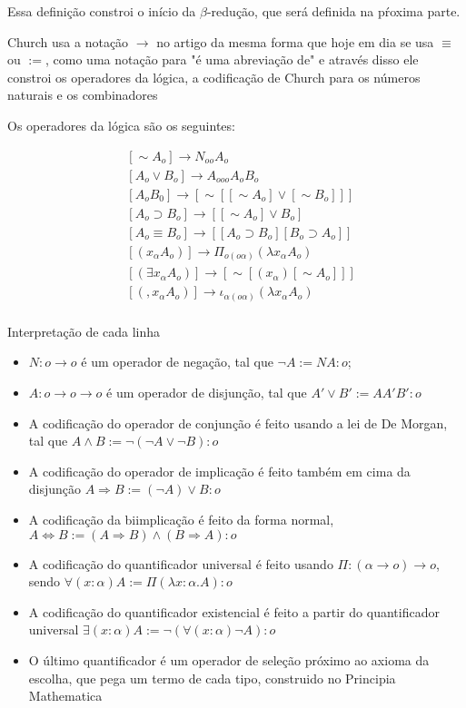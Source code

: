 \documentclass[../main.tex]{subfiles}
\begin{document}
Essa definição constroi o início da $\beta$-redução, que será definida na pŕoxima parte.

Church usa a notação $\to$ no artigo da mesma forma que hoje em dia se usa $\equiv$ ou $:=$, como uma notação para "é uma abreviação de" e através disso ele constroi os operadores da lógica, a codificação de Church para os números naturais e os combinadores

Os operadores da lógica são os seguintes:

\begin{align*}
    & [\sim A_o ] \to N_{oo}A_o \\
    & [A_o \lor B_o] \to A_{ooo} A_o B_o \\
    & [A_o B_0] \to [\sim [[\sim A_o] \lor [\sim B_o]]] \\
    & [A_o \supset B_o] \to [[\sim A_o] \lor B_o] \\
    & [A_o \equiv B_o] \to [[A_o \supset B_o][B_o \supset A_o]] \\
    & [(x_{\alpha}A_o)] \to \Pi_{o(o\alpha)}(\lambda x_{\alpha} A_o) \\
    & [(\exists x_{\alpha} A_o)] \to [\sim [(x_{\alpha})[\sim A_o]]] \\
    & [(, x_{\alpha}A_o)] \to \iota_{\alpha(o\alpha)}(\lambda x_{\alpha} A_o) \\
\end{align*}

Interpretação de cada linha

\begin{itemize}
    \item $N : o \to o$ é um operador de negação, tal que $\neg A := NA : o$;
    \item $A : o \to o \to o$ é um operador de disjunção, tal que $A' \lor B' := AA'B' : o$
    \item A codificação do operador de conjunção é feito usando a lei de De Morgan, tal que $A \land B := \neg (\neg A \lor \neg B) : o$
    \item A codificação do operador de implicação é feito também em cima da disjunção $A \Rightarrow B := (\neg A) \lor B : o$
    \item A codificação da biimplicação é feito da forma normal, $A \Leftrightarrow B := (A \Rightarrow B) \land (B \Rightarrow A) : o$
    \item A codificação do quantificador universal é feito usando $\Pi : (\alpha \to o) \to o$, sendo $\forall (x : \alpha) A := \Pi (\lambda x : \alpha . A) : o$
    \item A codificação do quantificador existencial é feito a partir do quantificador universal $\exists (x : \alpha) A := \neg (\forall (x : \alpha) \neg A) : o$
    \item O último quantificador é um operador de seleção próximo ao axioma da escolha, que pega um termo de cada tipo, construido no Principia Mathematica
\end{itemize}
\end{document}
